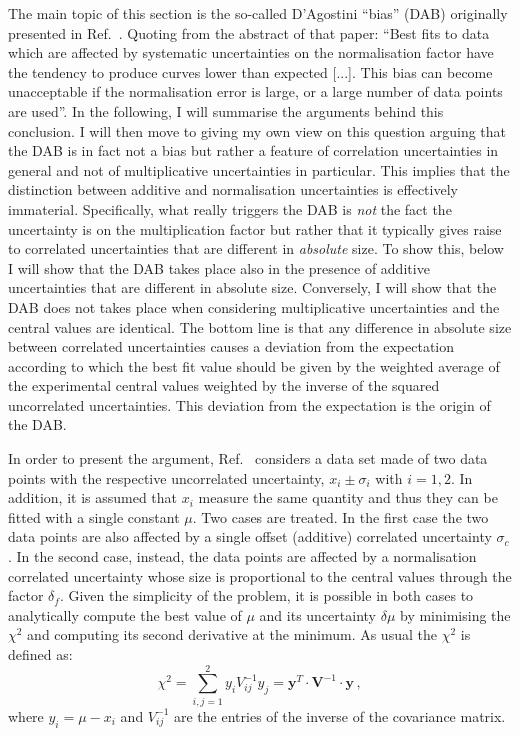 \documentclass[10pt,a4paper]{article}
\begin{document}
The main topic of this section is the so-called D'Agostini ``bias''
(DAB) originally presented in Ref.~\cite{DAgostini:1993arp}. Quoting
from the abstract of that paper: ``Best fits to data which are
affected by systematic uncertainties on the normalisation factor have
the tendency to produce curves lower than expected [...]. This bias
can become unacceptable if the normalisation error is large, or a
large number of data points are used''. In the following, I will
summarise the arguments behind this conclusion. I will then move to
giving my own view on this question arguing that the DAB is in fact
not a bias but rather a feature of correlation uncertainties in
general and not of multiplicative uncertainties in particular. This
implies that the distinction between additive and normalisation
uncertainties is effectively immaterial. Specifically, what really
triggers the DAB is \textit{not} the fact the uncertainty is on the
multiplication factor but rather that it typically gives raise to
correlated uncertainties that are different in \textit{absolute}
size. To show this, below I will show that the DAB takes place also in
the presence of additive uncertainties that are different in absolute
size. Conversely, I will show that the DAB does not takes place when
considering multiplicative uncertainties and the central values are
identical. The bottom line is that any difference in absolute size
between correlated uncertainties causes a deviation from the
expectation according to which the best fit value should be given by
the weighted average of the experimental central values weighted by
the inverse of the squared uncorrelated uncertainties. This deviation
from the expectation is the origin of the DAB.

In order to present the argument, Ref.~\cite{DAgostini:1993arp}
considers a data set made of two data points with the respective
uncorrelated uncertainty, $x_i\pm\sigma_i$ with $i=1,2$. In addition,
it is assumed that $x_i$ measure the same quantity and thus they can
be fitted with a single constant $\mu$. Two cases are treated. In the
first case the two data points are also affected by a single offset
(additive) correlated uncertainty $\sigma_c$. In the second case,
instead, the data points are affected by a normalisation correlated
uncertainty whose size is proportional to the central values through
the factor $\delta_f$. Given the simplicity of the problem, it is
possible in both cases to analytically compute the best value of $\mu$
and its uncertainty $\delta\mu$ by minimising the $\chi^2$ and
computing its second derivative at the minimum. As usual the $\chi^2$
is defined as:
\begin{equation}
\chi^2 = \sum_{i,j=1}^2y_iV^{-1}_{ij}y_j = \mathbf{y}^T\cdot
\mathbf{V}^{-1}\cdot \mathbf{y}\,,
\end{equation}
where $y_i=\mu-x_i$ and $V^{-1}_{ij}$ are the entries of the inverse
of the covariance matrix.
\end{document}
